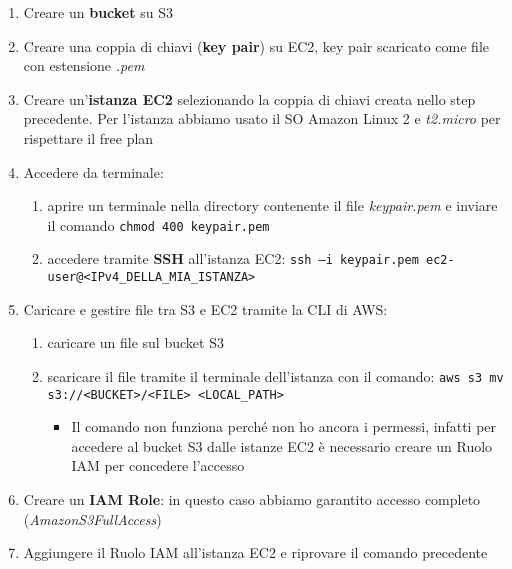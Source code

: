 \begin{enumerate}
    \item Creare un \textbf{bucket} su S3
    
    \item Creare una coppia di chiavi (\textbf{key pair}) su EC2, key pair scaricato come file con estensione \textit{.pem}
    
    \item Creare un'\textbf{istanza EC2} selezionando la coppia di chiavi creata nello step precedente. Per l'istanza abbiamo usato il SO Amazon Linux 2 e \textit{t2.micro} per rispettare il free plan
    
    \item Accedere da terminale:
    \begin{enumerate}
        \item aprire un terminale nella directory contenente il file \textit{keypair.pem} e inviare il comando \verb|chmod 400 keypair.pem|
        \item accedere tramite \textbf{SSH} all'istanza EC2: \verb|ssh –i keypair.pem ec2-user@<IPv4_DELLA_MIA_ISTANZA>|
    \end{enumerate}

    \item Caricare e gestire file tra S3 e EC2 tramite la CLI di AWS:
    \begin{enumerate}
        \item caricare un file sul bucket S3
        \item scaricare il file tramite il terminale dell'istanza con il comando: \verb|aws s3 mv s3://<BUCKET>/<FILE> <LOCAL_PATH>|
        \begin{itemize}
            \item Il comando non funziona perché non ho ancora i permessi, infatti per accedere al bucket S3 dalle istanze EC2 è necessario creare un Ruolo IAM per concedere l’accesso
        \end{itemize}
    \end{enumerate}

    \item Creare un \textbf{IAM Role}: in questo caso abbiamo garantito accesso completo (\textit{AmazonS3FullAccess})

    \item Aggiungere il Ruolo IAM all’istanza EC2 e riprovare il comando precedente
    
\end{enumerate}

